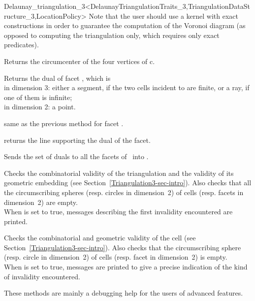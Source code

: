 \begin{ccRefClass}{Delaunay_triangulation_3<DelaunayTriangulationTraits_3,TriangulationDataStructure_3,LocationPolicy>}
Note that the user should use a kernel with exact constructions in order
to guarantee the computation of the Voronoi diagram (as opposed to computing
the triangulation only, which requires only exact predicates).

{Returns the circumcenter of the four vertices of c.
}

{Returns the dual of facet , which is \\
in dimension 3: either a segment, if the two cells incident to   
are finite, or a ray, if one of them is infinite;\\
in dimension 2: a point.
}

{same as the previous method for facet .}

{returns the line supporting the dual of the facet.
}

{Sends the set of duals to all the facets of \ccVar\ into .}


\begin{ccAdvanced}
{Checks the combinatorial validity of the triangulation and the
validity of its geometric embedding (see
Section~\ref{Triangulation3-sec-intro}). Also checks that all the
circumscribing spheres (resp. circles in dimension~2) of  cells
(resp. facets in dimension~2) are empty.\\ When  is set to
true,  messages describing the first invalidity encountered are
printed.}

{Checks the combinatorial and geometric validity of the cell (see
Section~\ref{Triangulation3-sec-intro}). Also checks that the
circumscribing sphere (resp. circle in dimension~2) of  cells
(resp. facet in dimension~2) is empty.\\
 When  is set to
true, messages are printed to give
a precise indication of the kind of invalidity encountered.}

These methods are  mainly a debugging help for the users of advanced features.
\end{ccAdvanced}

\ccSeeAlso


\end{ccRefClass}

